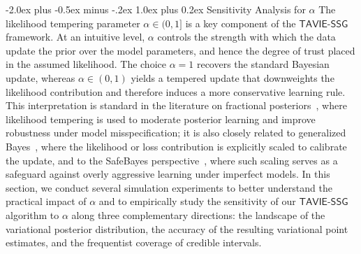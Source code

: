 \documentclass[12pt]{article}
\makeatletter
\def\section{\@startsection{section}{1}{\z@}
  {-2.0ex plus -0.5ex minus -.2ex} %
  {1.0ex plus 0.2ex}               %
  {\normalfont\Large\bfseries}}
\numberwithin{equation}{section}
\newcommand{\tssg}{\mathsf{TAVIE}\text{-}\mathsf{SSG}}
\makeatother
\begin{document}
{
\section{Sensitivity Analysis for \texorpdfstring{$\alpha$}{alpha}}\label{sec:sensitivity-alpha}
The likelihood tempering parameter $\alpha \in (0,1]$ is a key component of the $\tssg$ framework.
At an intuitive level, $\alpha$ controls the strength with which the data update the prior over the model parameters, and hence the degree of trust placed in the assumed likelihood. The choice $\alpha=1$ recovers the standard Bayesian update, whereas $\alpha\in (0, 1)$ yields a tempered update that downweights the likelihood contribution and therefore induces a more conservative learning rule. This interpretation is standard in the literature on fractional posteriors~\citep{Bayesian-fractional-posterior}, where likelihood tempering is used to moderate posterior learning and improve robustness under model misspecification; it is also closely related to generalized Bayes~\citep{BissiriHolmesWalker2016}, where the likelihood or loss contribution is explicitly scaled to calibrate the update, and to the SafeBayes perspective~\citep{GrunwaldVanOmmen2017}, where such scaling serves as a safeguard against overly aggressive learning under imperfect models. In this section, we conduct several simulation experiments to better understand the practical impact of $\alpha$ and to empirically study the sensitivity of our $\tssg$ algorithm to $\alpha$ along three complementary directions: the landscape of the variational posterior distribution, the accuracy of the resulting variational point estimates, and the frequentist coverage of credible intervals.

}
\end{document}

